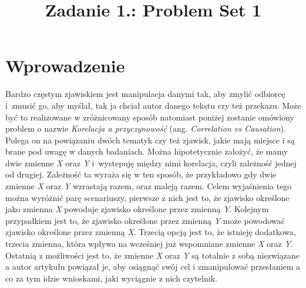 \documentclass{classrep}
\author{%
    \studentinfo[239676@edu.p.lodz.pl]{Kamil Kowalewski}{239676}
}
\title{Zadanie 1.: Problem Set 1}
\begin{document}
    \maketitle
    \thispagestyle{fancyplain}

    \section{Wprowadzenie}
    \label{intro} {
        Bardzo częstym zjawiskiem jest manipulacja danymi tak, aby zmylić odbiorcę
        i~zmusić go, aby myślał, tak ja chciał autor danego tekstu czy też przekazu.
        Może być to realizowane w zróżnicowany sposób natomiast poniżej zostanie
        omówiony problem o nazwie \emph{Korelacja a przyczynowość}
        (ang. \emph{Correlation vs Causation}). Polega on na powiązaniu dwóch tematyk
        czy też zjawisk, jakie mają miejsce i są brane pod uwagę w danych badaniach.
        Można hipotetycznie założyć, że mamy dwie zmienne \textit{X} oraz \textit{Y}
        i~wystepuję między nimi korelacja, czyli zależność jednej od drugiej. Zależność
        ta wyraża się w ten sposób, że przykładowo gdy dwie zmienne \textit{X}
        oraz \textit{Y} wzrastają razem, oraz maleją razem. Celem wyjaśnienia tego można
        wyróżnić parę scenariuszy, pierwsze z nich jest to, że zjawisko określone jako
        zmienna \textit{X} powoduje zjawisko określone przez zmienną \textit{Y}.
        Kolejnym przypadkiem jest to, że zjawisko określone przez zmienną \textit{Y}
        może powodować zjawisko określone przez zmienną \textit{X}. Trzecią opcją jest
        to, że istnieję dodatkowa, trzecia zmienna, która wpływa na wcześniej już
        wspomniane zmienne \textit{X} oraz \textit{Y}. Ostatnią z możliwości jest to,
        że zmienne \textit{X} oraz \textit{Y} są totalnie z sobą niezwiązane a autor
        artykułu powiązał je, aby osiągnąć swój cel i zmanipulować przesłaniem a co za
        tym idzie wnioskami, jaki wyciągnie z nich czytelnik.
    }
\end{document}
